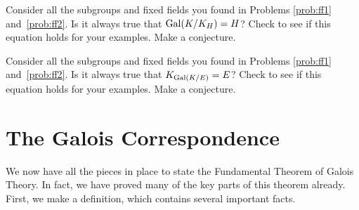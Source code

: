 \begin{problem}
    Consider all the subgroups and fixed fields you found in Problems \ref{prob:ff1} and~\ref{prob:ff2}.  Is it always true that $\operatorname{Gal}(K/K_H) = H$?  Check to see if this equation holds for your examples. Make a conjecture.
\end{problem}



\begin{problem}
 Consider all the subgroups and fixed fields you found in Problems \ref{prob:ff1} and~\ref{prob:ff2}.  Is it always true that $K_{\operatorname{Gal}(K/E)} = E$?  Check to see if this equation holds for your examples.  Make a conjecture.
\end{problem}

\section{The Galois Correspondence}

We now have all the pieces in place to state the Fundamental Theorem of Galois Theory. In fact, we have proved many of the key parts of this theorem already. First, we make a definition, which contains several important facts.

